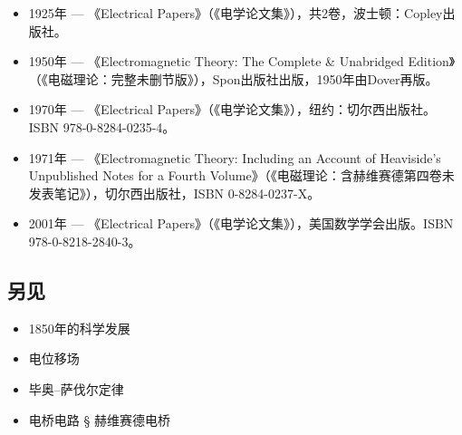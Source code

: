 \begin{itemize}
\item 1925年 — 《Electrical Papers》（《电学论文集》），共2卷，波士顿：Copley出版社。
\item 1950年 — 《Electromagnetic Theory: The Complete & Unabridged Edition》（《电磁理论：完整未删节版》），Spon出版社出版，1950年由Dover再版。
\item 1970年 — 《Electrical Papers》（《电学论文集》），纽约：切尔西出版社。ISBN 978-0-8284-0235-4。
\item 1971年 — 《Electromagnetic Theory: Including an Account of Heaviside's Unpublished Notes for a Fourth Volume》（《电磁理论：含赫维赛德第四卷未发表笔记》），切尔西出版社，ISBN 0-8284-0237-X。
\item 2001年 — 《Electrical Papers》（《电学论文集》），美国数学学会出版。ISBN 978-0-8218-2840-3。
\end{itemize}
\subsection{另见}
\begin{itemize}
\item 1850年的科学发展
\item 电位移场
\item 毕奥–萨伐尔定律
\item 电桥电路 § 赫维赛德电桥
\end{itemize}
